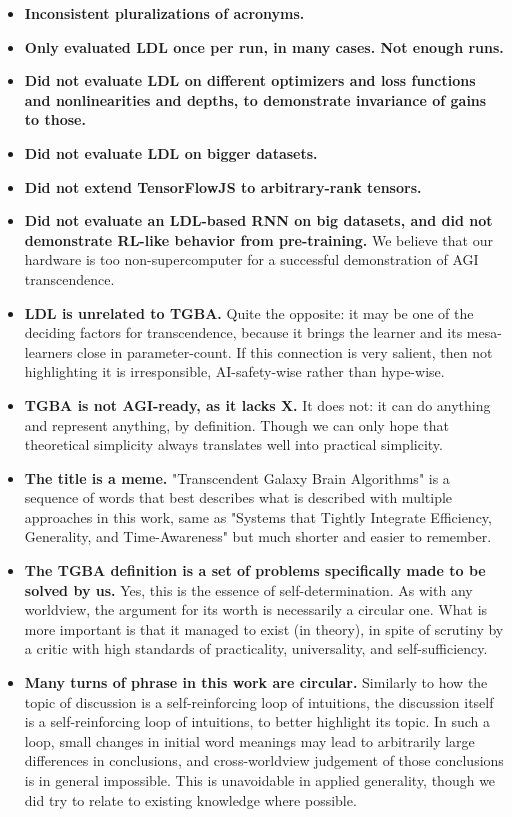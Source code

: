 \documentclass{article}
\begin{document}
\begin{itemize}
\item \textbf{Inconsistent pluralizations of acronyms.}
\item \textbf{Only evaluated LDL once per run, in many cases. Not enough runs.}
\item \textbf{Did not evaluate LDL on different optimizers and loss functions and nonlinearities and depths, to demonstrate invariance of gains to those.}
\item \textbf{Did not evaluate LDL on bigger datasets.}
\item \textbf{Did not extend TensorFlowJS to arbitrary-rank tensors.}
\item \textbf{Did not evaluate an LDL-based RNN on big datasets, and did not demonstrate RL-like behavior from pre-training.} We believe that our hardware is too non-supercomputer for a successful demonstration of AGI transcendence.
\item \textbf{LDL is unrelated to TGBA.} Quite the opposite: it may be one of the deciding factors for transcendence, because it brings the learner and its mesa-learners close in parameter-count. If this connection is very salient, then not highlighting it is irresponsible, AI-safety-wise rather than hype-wise.
\item \textbf{TGBA is not AGI-ready, as it lacks X.} It does not: it can do anything and represent anything, by definition. Though we can only hope that theoretical simplicity always translates well into practical simplicity.
\item \textbf{The title is a meme.} "Transcendent Galaxy Brain Algorithms" is a sequence of words that best describes what is described with multiple approaches in this work, same as "Systems that Tightly Integrate Efficiency, Generality, and Time-Awareness" but much shorter and easier to remember.
\item \textbf{The TGBA definition is a set of problems specifically made to be solved by us.} Yes, this is the essence of self-determination. As with any worldview, the argument for its worth is necessarily a circular one. What is more important is that it managed to exist (in theory), in spite of scrutiny by a critic with high standards of practicality, universality, and self-sufficiency.
\item \textbf{Many turns of phrase in this work are circular.} Similarly to how the topic of discussion is a self-reinforcing loop of intuitions, the discussion itself is a self-reinforcing loop of intuitions, to better highlight its topic. In such a loop, small changes in initial word meanings may lead to arbitrarily large differences in conclusions, and cross-worldview judgement of those conclusions is in general impossible. This is unavoidable in applied generality, though we did try to relate to existing knowledge where possible.

\end{itemize}
\end{document}
